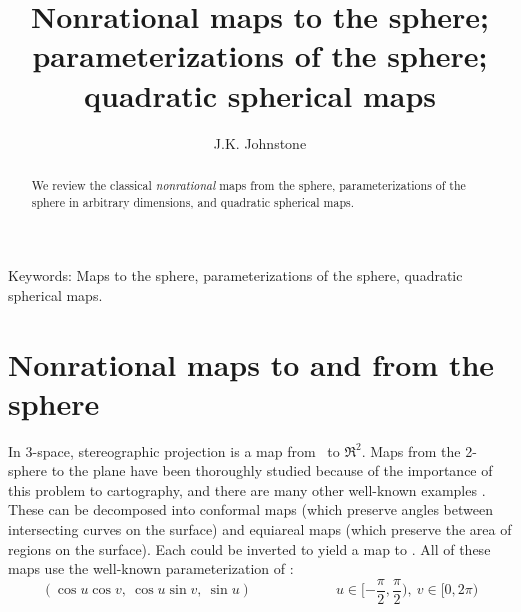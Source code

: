 \newif\ifFull
\Fullfalse

\SingleSpace

\setlength{\oddsidemargin}{0pt}
\setlength{\topmargin}{0pt}
\setlength{\headsep}{3em}
\setlength{\textheight}{8.75in}
\setlength{\textwidth}{6.5in}
\setlength{\columnsep}{5mm}		%

\pagestyle{myheadings}


\title{Nonrational maps to the sphere;\\parameterizations of the sphere; \\quadratic spherical maps}
\author{J.K. Johnstone}


\maketitle

\begin{abstract}
We review the classical {\em nonrational} maps from the sphere,
parameterizations of the sphere in arbitrary dimensions, 
and quadratic spherical maps.
\end{abstract}

\noindent Keywords: Maps to the sphere, parameterizations of the sphere, 
quadratic spherical maps.

\clearpage

\section{Nonrational maps to and from the sphere}


In 3-space, stereographic projection is a map from \ to $\Re^2$.
Maps from the 2-sphere to the plane have been thoroughly studied
because of the importance of this problem to cartography,
and there are many other well-known examples \cite{kreyszig59}.
These can be decomposed into conformal maps (which preserve angles between 
intersecting curves on the surface) and equiareal maps (which preserve 
the area of regions on the surface).
Each could be inverted to yield a map to .
All of these maps use the well-known parameterization of :
\[
	(\cos u \cos v,\ \cos u \sin v,\ \sin u) \hspace{1in} 
	u \in [-\frac{\pi}{2}, \frac{\pi}{2}),\ v \in [0,2\pi)
\]

